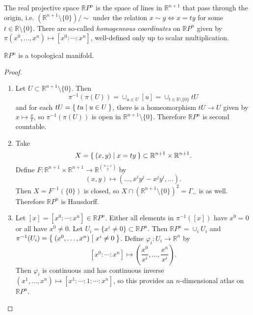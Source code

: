 \begin{xmpl}
The real projective space $\mathbb{R}P^n$ is the space of lines in
$\mathbb{R}^{n+1}$ that pass through the origin, i.e.
$(\mathbb{R}^{n+1} \setminus \{ 0 \}) / \sim$ under the relation
$x \sim y \iff x = ty$ for some $t \in \mathbb{R} \setminus \{ 0 \}$.
There are so-called \emph{homogeneous coordinates} on $\mathbb{R}P^n$
given by $\pi(x^0, \dots, x^n) \mapsto [x^0 : \cdots : x^n]$,
well-defined only up to scalar multiplication.

\begin{prop}
$\mathbb{R} P^n$ is a topological manifold.
\end{prop}

\begin{proof}
  \begin{enumerate}
    \item{
      Let $U \subset \mathbb{R}^{n+1} \setminus \{ 0 \}$. Then
      $$
        \pi^{-1}(\pi(U))
      = \cup_{u \in U} [u]
      = \cup_{t \in \mathbb{R} \setminus \{ 0 \}}
          t U
      $$
      and for each $tU = \Set{ t u | u \in U }$, there is a
      homeomorphism
      $tU \to U$ given by $x \mapsto \frac{x}{t}$, so
      $\pi^{-1}(\pi(U))$ is open in
      $\mathbb{R}^{n+1} \setminus \{ 0 \}$. Therefore
      $\mathbb{R}P^n$ is second countable.
    }
    \item{
      Take
      $$
        X
      = \Set{(x, y) | x = ty}
      \subset \mathbb{R}^{n+1} \times \mathbb{R}^{n+1}.
      $$
      Define
      $   F
      :   \mathbb{R}^{n+1} \times \mathbb{R}^{n+1}
      \to \mathbb{R}^{{n+1 \choose 2}}$
      by
      $$
        (x, y)
      \mapsto
        (\dots, x^i y^j - x^j y^i, \dots).
      $$
      Then $X = F^{-1}(\{0 \})$ is closed, so
      $X \cap (\mathbb{R}^{n+1} \setminus \{0\})^2 = \Gamma_\sim$ is
      as well. Therefore $\mathbb{R} P^n$ is Hausdorff.
    }
    \item{
      Let $[x] = [x^0 : \cdots : x^n] \in \mathbb{R} P^n$. Either all
      elements in $\pi^{-1}([x])$ have $x^0 = 0$ or all have
      $x^0 \neq 0$. Let $U_i = \{ x^i \neq 0 \} \subset
      \mathbb{R}P^n$. Then $\mathbb{R}P^n = \cup_i U_i$ and
      $\pi^{-1}(U_i) = \Set{ (x^0, \dots, x^n) | x^i \neq 0 }$. Define
      $\varphi_i : U_i \to \mathbb{R}^n$ by
      $$
        [x^0 : \cdots : x^n]
      \mapsto
        \left(
          \frac{x^0}{x^i},
          \dots,
          \frac{x^n}{x^i}
        \right).
      $$
      Then $\varphi_i$ is continuous and has continuous inverse
      $(x^1, \dots, x^n) \mapsto [x^1: \cdots : 1 : \cdots : x^n]$, so
      this provides an $n$-dimensional atlas on $\mathbb{R}P^n$.

}
\end{enumerate}
\end{proof}
\end{xmpl}
